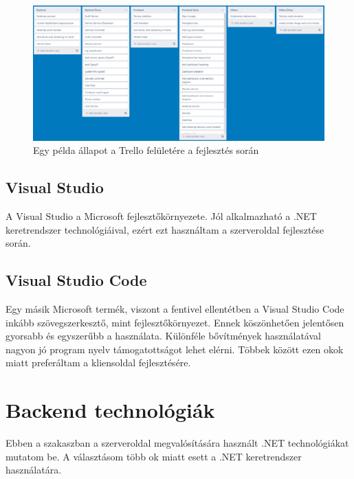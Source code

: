 \begin{figure}[!ht]
    \centering
    \includegraphics[width=150mm, keepaspectratio]{figures/trello-3.png}
    \caption{Egy példa állapot a Trello felületére a fejlesztés során}
    \label{fig:trello}
\end{figure}

\subsection{Visual Studio}
A Visual Studio \cite{vs} a Microsoft fejlesztőkörnyezete. Jól alkalmazható a .NET keretrendszer technológiáival, ezért ezt használtam a szerveroldal fejlesztése során.

\subsection{Visual Studio Code}
Egy másik Microsoft termék, viszont a fentivel ellentétben a Visual Studio Code \cite{vs-code} inkább szövegszerkesztő, mint fejlesztőkörnyezet.
Ennek köszönhetően jelentősen gyorsabb és egyszerűbb a használata. Különféle bővítmények használatával nagyon jó program nyelv támogatottságot lehet elérni.
Többek között ezen okok miatt preferáltam a kliensoldal fejlesztésére. 

\section{Backend technológiák}
Ebben a szakaszban a szerveroldal megvalósítására használt .NET technológiákat mutatom be. A választásom több ok miatt esett a .NET keretrendszer használatára.

